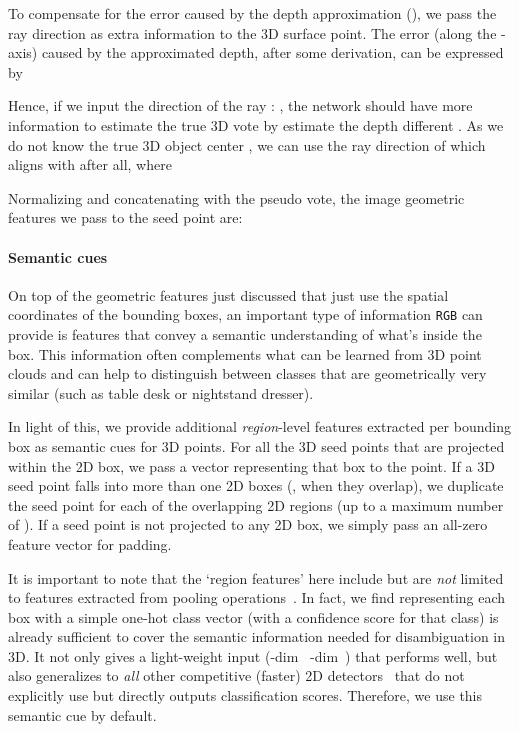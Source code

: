 \documentclass[10pt,twocolumn,letterpaper]{article}
\newcommand{\rgb}{\texttt{RGB}\xspace}
\begin{document}
To compensate for the error caused by the depth approximation (), we pass the ray direction as extra information to the 3D surface point. 
The error (along the -axis) caused by the approximated depth, after some derivation, can be expressed by


Hence, if we input the direction of the ray : , the network should have more information to estimate the true 3D vote by estimate the depth different . As we do not know the true 3D object center , we can use the ray direction of  which aligns with  after all, where


Normalizing and concatenating with the pseudo vote, the image geometric features we pass to the seed point  are:


\paragraph{Semantic cues}
On top of the geometric features just discussed that just use the spatial coordinates of the bounding boxes, an important type of information \rgb can provide is features that convey a semantic understanding of what's inside the box. This information often complements what can be learned from 3D point clouds and can help to distinguish between classes that are geometrically very similar (such as table \vs desk or nightstand \vs dresser).

In light of this, we provide additional \emph{region}-level features extracted per bounding box as semantic cues for 3D points. For all the 3D seed points that are projected within the 2D box, we pass a vector representing that box to the point. If a 3D seed point falls into more than one 2D boxes (\ie, when they overlap), we duplicate the seed point for each of the overlapping 2D regions (up to a maximum number of ). If a seed point is not projected to any 2D box, we simply pass an all-zero feature vector for padding.

It is important to note that the `region features' here include but are \emph{not} limited to features extracted from \roi pooling operations~\cite{ren2015faster}. In fact, we find representing each box with a simple one-hot class vector (with a confidence score for that class) is already sufficient to cover the semantic information needed for disambiguation in 3D. It not only gives a light-weight input (-dim~\cite{sung2015data} -dim~\cite{lin2017feature}) that performs well, but also generalizes to \emph{all} other competitive (\eg faster) 2D detectors~\cite{redmon2016you,liu2016ssd,lin2017focal} that do not explicitly use \roi but directly outputs classification scores. Therefore, we use this semantic cue by default.
\end{document}
